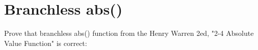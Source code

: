 \section{Branchless abs()}

Prove that branchless abs() function from the Henry Warren 2ed, "2-4 Absolute Value Function" is correct:



